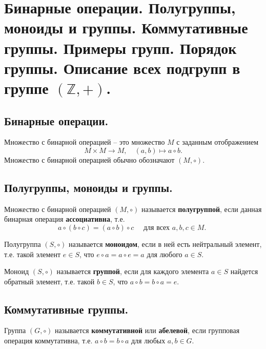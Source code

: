 \section{Бинарные операции. Полугруппы, моноиды и группы. Коммутативные группы. Примеры групп. Порядок группы. Описание всех подгрупп в группе $(\mathbb{Z}, +)$.}



\subsection{Бинарные операции.}
\begin{definition}
    Множество с бинарной операцией -- это множество $M$ с заданным отображением
    \[
        M \times M \to M,
        \quad
        (a, b) \mapsto a \circ b.
    \]
    Множество с бинарной операцией обычно обозначают $(M, \circ)$.
\end{definition}

\subsection{Полугруппы, моноиды и группы.}
\begin{definition}
    Множество с бинарной операцией $(M, \circ)$ называется \textbf{полугруппой}, если данная бинарная операция \textbf{ассоциативна}, т.е.
    \[
        a \circ (b \circ c) = (a \circ b) \circ c
        \quad
        \text{ для всех $a,b,c \in M$. }
    \]
\end{definition}
\begin{definition}
    Полугруппа $(S, \circ)$ называется \textbf{моноидом}, если в ней есть нейтральный элемент, т.е. такой элемент $e \in S$, что $e \circ a = a \circ e = a$ для любого $a \in S$.
\end{definition}
\begin{definition}
    Моноид $(S, \circ)$ называется \textbf{группой}, если для каждого элемента $a \in S$ найдется обратный элемент, т.е. такой $b \in S$, что $a \circ b = b \circ a = e$.
\end{definition}

\subsection{Коммутативные группы.}
\begin{definition}
    Группа $(G, \circ)$ называется \textbf{коммутативной} или \textbf{абелевой}, если групповая операция коммутативна, т.е. $a \circ b = b \circ a$ для любых $a, b \in G$.
\end{definition}

